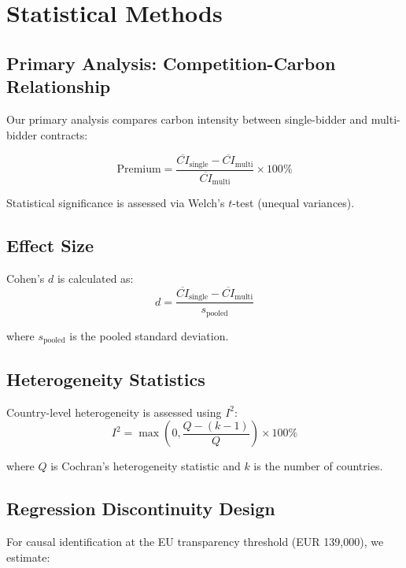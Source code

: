 \documentclass[11pt]{article}
\begin{document}
\section{Statistical Methods}

\subsection{Primary Analysis: Competition-Carbon Relationship}

Our primary analysis compares carbon intensity between single-bidder and multi-bidder contracts:

\begin{equation}
\text{Premium} = \frac{\overline{CI}_{\text{single}} - \overline{CI}_{\text{multi}}}{\overline{CI}_{\text{multi}}} \times 100\%
\end{equation}

Statistical significance is assessed via Welch's $t$-test (unequal variances).

\subsection{Effect Size}

Cohen's $d$ is calculated as:
\begin{equation}
d = \frac{\overline{CI}_{\text{single}} - \overline{CI}_{\text{multi}}}{s_{\text{pooled}}}
\end{equation}

where $s_{\text{pooled}}$ is the pooled standard deviation.

\subsection{Heterogeneity Statistics}

Country-level heterogeneity is assessed using $I^2$:
\begin{equation}
I^2 = \max\left(0, \frac{Q - (k-1)}{Q}\right) \times 100\%
\end{equation}

where $Q$ is Cochran's heterogeneity statistic and $k$ is the number of countries.

\subsection{Regression Discontinuity Design}

For causal identification at the EU transparency threshold (EUR 139,000), we estimate:
\end{document}
